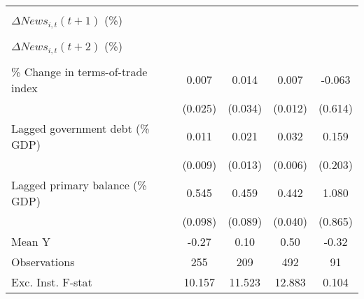 {\begin{tabular}{l*{4}{c}}
                    &                     &                     &                     &                     \\
\addlinespace
$ \Delta News_{i,t}(t+1)$ (\%)&                     &                     &                     &                     \\
                    &                     &                     &                     &                     \\
\addlinespace
$ \Delta News_{i,t}(t+2)$ (\%)&                     &                     &                     &                     \\
                    &                     &                     &                     &                     \\
\addlinespace
\% Change in terms-of-trade index&       0.007         &       0.014         &       0.007         &      -0.063         \\
                    &     (0.025)         &     (0.034)         &     (0.012)         &     (0.614)         \\
\addlinespace
Lagged government debt (\% GDP)&       0.011         &       0.021\sym{*}  &       0.032\sym{***}&       0.159         \\
                    &     (0.009)         &     (0.013)         &     (0.006)         &     (0.203)         \\
\addlinespace
Lagged primary balance (\% GDP)&       0.545\sym{***}&       0.459\sym{***}&       0.442\sym{***}&       1.080         \\
                    &     (0.098)         &     (0.089)         &     (0.040)         &     (0.865)         \\
\midrule
Mean Y              &       -0.27         &        0.10         &        0.50         &       -0.32         \\
Observations        &         255         &         209         &         492         &          91         \\
Exc. Inst. F-stat   &      10.157         &      11.523         &      12.883         &       0.104         \\
\bottomrule
\end{tabular}
}

